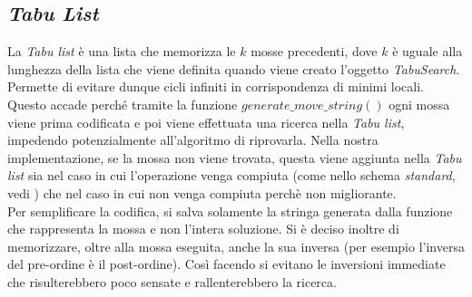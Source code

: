 \subsection{\textit{Tabu List}}
\label{sec:tabu-list}
\noindent La \textit{Tabu list} \cite{siteS:dispense-de-giovanni} è una lista che memorizza le $k$ mosse precedenti, dove $k$ è uguale
alla lunghezza della lista che viene definita quando viene creato l'oggetto \textit{TabuSearch}.
Permette di evitare dunque cicli infiniti in corrispondenza
di minimi locali. Questo accade perché tramite la funzione
$generate\_move\_string()$ ogni mossa
viene prima codificata e poi viene effettuata una ricerca nella \textit{Tabu list}, impedendo potenzialmente all’algoritmo di riprovarla.
Nella nostra implementazione, se la mossa non viene trovata, questa viene aggiunta nella \textit{Tabu list} sia nel caso in cui l'operazione venga compiuta
(come nello schema \textit{standard}, vedi \cite{siteS:dispense-de-giovanni}) che nel caso in cui non
venga compiuta perchè non migliorante.\\
Per semplificare la codifica, si salva solamente la stringa generata dalla funzione che rappresenta la mossa e non l’intera
soluzione.
Si è deciso inoltre di memorizzare, oltre alla mossa eseguita, anche la sua inversa
(per esempio l'inversa del pre-ordine è il post-ordine). Così facendo si
evitano le inversioni immediate che risulterebbero poco sensate e rallenterebbero la ricerca.

